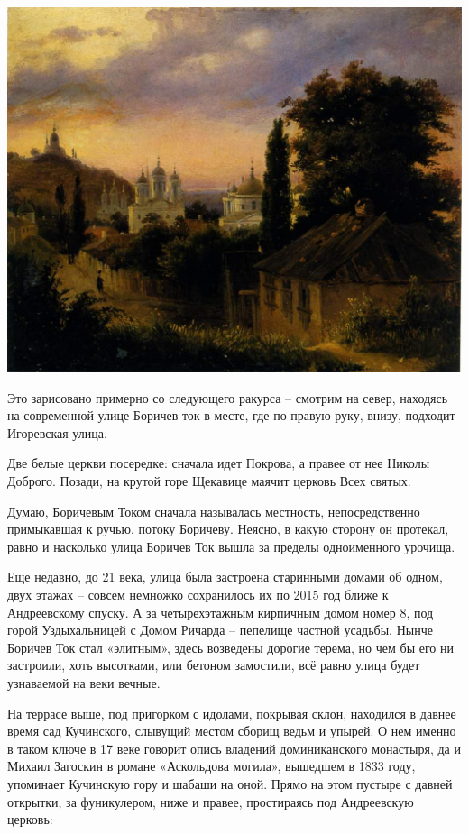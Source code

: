 \begin{center}
\includegraphics[width=\linewidth]{chast-colebanie-osnov/borichev-tok/st-1837.jpg}
\end{center}

Это зарисовано примерно со следующего ракурса – смотрим на север, находясь на современной улице Боричев ток в месте, где по правую руку, внизу, подходит Игоревская улица.

Две белые церкви посередке: сначала идет Покрова, а правее от нее Николы Доброго. Позади, на крутой горе Щекавице маячит церковь Всех святых.

Думаю, Боричевым Током сначала называлась местность, непосредственно примыкавшая к ручью, потоку Боричеву. Неясно, в какую сторону он протекал, равно и насколько улица Боричев Ток вышла за пределы одноименного урочища.

Еще недавно, до 21 века, улица была застроена старинными домами об одном, двух этажах – совсем немножко сохранилось их по 2015 год ближе к Андреевскому спуску. А за четырехэтажным кирпичным домом номер 8, под горой Уздыхальницей с Домом Ричарда – пепелище частной усадьбы. Нынче Боричев Ток стал «элитным», здесь возведены дорогие терема, но чем бы его ни застроили, хоть высотками, или бетоном замостили, всё равно улица будет узнаваемой на веки вечные.

На террасе выше, под пригорком с идолами, покрывая склон, находился в давнее время сад Кучинского, слывущий местом сборищ ведьм и упырей. О нем именно в таком ключе в 17 веке говорит опись владений доминиканского монастыря, да и Михаил Загоскин в романе «Аскольдова могила», вышедшем в 1833 году, упоминает Кучинскую гору и шабаши на оной. Прямо на этом пустыре с давней открытки, за фуникулером, ниже и правее, простираясь под Андреевскую церковь:

